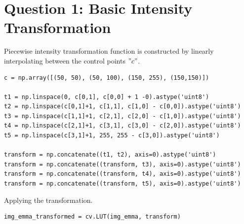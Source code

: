 \documentclass[11pt]{article}
\begin{document}

\newpage


\section*{Question 1: Basic Intensity Transformation}
Piecewise intensity transformation function is constructed by linearly interpolating between the control points $"c"$.

\begin{lstlisting}[style=pythonstyle]
c = np.array([(50, 50), (50, 100), (150, 255), (150,150)])

t1 = np.linspace(0, c[0,1], c[0,0] + 1 -0).astype('uint8')
t2 = np.linspace(c[0,1]+1, c[1,1], c[1,0] - c[0,0]).astype('uint8')
t3 = np.linspace(c[1,1]+1, c[2,1], c[2,0] - c[1,0]).astype('uint8')
t4 = np.linspace(c[2,1]+1, c[3,1], c[3,0] - c[2,0]).astype('uint8')
t5 = np.linspace(c[3,1]+1, 255, 255 - c[3,0]).astype('uint8')

transform = np.concatenate((t1, t2), axis=0).astype('uint8')
transform = np.concatenate((transform, t3), axis=0).astype('uint8')
transform = np.concatenate((transform, t4), axis=0).astype('uint8')
transform = np.concatenate((transform, t5), axis=0).astype('uint8')
\end{lstlisting}

Applying the transformation. 
\begin{lstlisting}[style=pythonstyle]
img_emma_transformed = cv.LUT(img_emma, transform)
\end{lstlisting}
\end{document}
